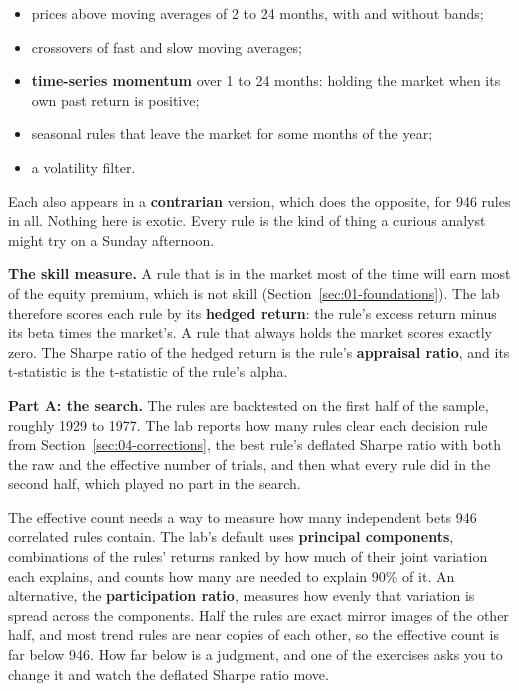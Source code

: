 \begin{itemize}
  \item prices above moving averages of 2 to 24 months, with and without bands;
  \item crossovers of fast and slow moving averages;
  \item \textbf{time-series momentum} over 1 to 24 months: holding the market when its own past return is positive;
  \item seasonal rules that leave the market for some months of the year;
  \item a volatility filter.
\end{itemize}

Each also appears in a \textbf{contrarian} version, which does the opposite, for 946 rules in all. Nothing here is exotic. Every rule is the kind of thing a curious analyst might try on a Sunday afternoon.

\textbf{The skill measure.} A rule that is in the market most of the time will earn most of the equity premium, which is not skill (Section~\ref{sec:01-foundations}). The lab therefore scores each rule by its \textbf{hedged return}: the rule's excess return minus its beta times the market's. A rule that always holds the market scores exactly zero. The Sharpe ratio of the hedged return is the rule's \textbf{appraisal ratio}, and its t-statistic is the t-statistic of the rule's alpha.

\textbf{Part A: the search.} The rules are backtested on the first half of the sample, roughly 1929 to 1977. The lab reports how many rules clear each decision rule from Section~\ref{sec:04-corrections}, the best rule's deflated Sharpe ratio with both the raw and the effective number of trials, and then what every rule did in the second half, which played no part in the search.

The effective count needs a way to measure how many independent bets 946 correlated rules contain. The lab's default uses \textbf{principal components}, combinations of the rules' returns ranked by how much of their joint variation each explains, and counts how many are needed to explain 90\% of it. An alternative, the \textbf{participation ratio}, measures how evenly that variation is spread across the components. Half the rules are exact mirror images of the other half, and most trend rules are near copies of each other, so the effective count is far below 946. How far below is a judgment, and one of the exercises asks you to change it and watch the deflated Sharpe ratio move.

